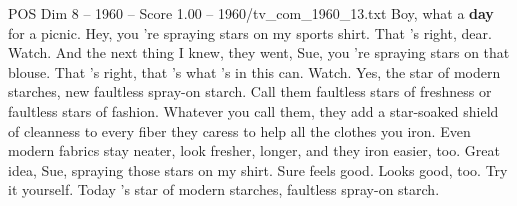 \begin{textsample}{POS Dim 8 – 1960 – Score 1.00 – 1960/tv\_com\_1960\_13.txt}  \label{ex:f8_pos_068}
Boy, what a \textbf{day} for a picnic.
Hey, you 're spraying stars on my sports shirt.
That 's right, dear.
Watch.
And the next thing I knew, they went, Sue, you 're spraying stars on that blouse.
That 's right, that 's what 's in this can.
Watch.
Yes, the star of modern starches, new faultless spray-on starch.
Call them faultless stars of freshness or faultless stars of fashion.
Whatever you call them, they add a star-soaked shield of cleanness to every fiber they caress to help all the clothes you iron.
Even modern fabrics stay neater, look fresher, longer, and they iron easier, too.
Great idea, Sue, spraying those stars on my shirt.
Sure feels good.
Looks good, too.
Try it yourself.
Today 's star of modern starches, faultless spray-on starch.

\end{textsample}
